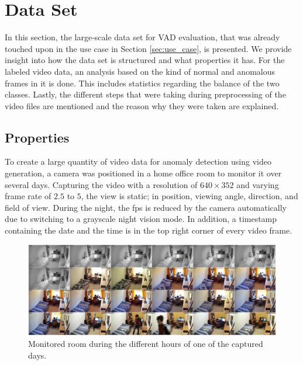 \section{Data Set} \label{sec:dataset}

In this section, the large-scale data set for VAD evaluation, that was already touched upon in the use case in Section \ref{sec:use_case}, is presented. We provide insight into how the data set is structured and what properties it has. For the labeled video data, an analysis based on the kind of normal and anomalous frames in it is done. This includes statistics regarding the balance of the two classes. Lastly, the different steps that were taking during preprocessing of the video files are mentioned and the reason why they were taken are explained.


\subsection{Properties} \label{subsec:dataset_properties}

To create a large quantity of video data for anomaly detection using video generation, a camera was positioned in a home office room to monitor it over several days. Capturing the video with a resolution of $640 \times 352$ and varying frame rate of $2.5$ to $5$, the view is static; in position, viewing angle, direction, and field of view. During the night, the fps is reduced by the camera automatically due to switching to a grayscale night vision mode. In addition, a timestamp containing the date and the time is in the top right corner of every video frame.

\begin{figure}
	\centering
	\includegraphics[width=1\textwidth]{graphics/cctv/oneDay/oneDay.pdf}
  \caption[Monitored room during different hours of the day]{Monitored room during the different hours of one of the captured days.}
  \label{fig:room_frames}
\end{figure}

